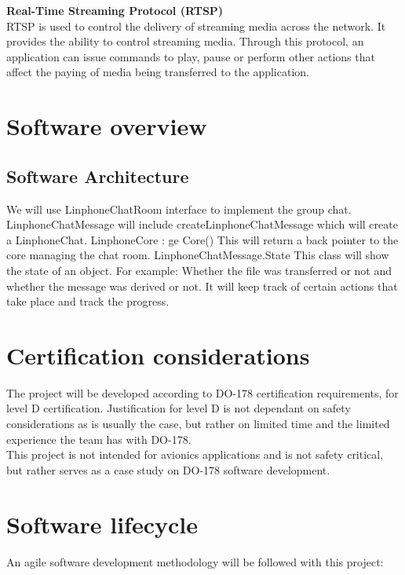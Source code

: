 \documentclass[a4paper]{article}
\begin{document}
\textbf{Real-Time Streaming Protocol (RTSP)\\}
RTSP is used to control the delivery of streaming media across the network. It provides the ability to control streaming media. Through this protocol, an application can issue commands to play, pause or perform other actions that affect the paying of media being transferred to the application.
\newpage

\section{Software overview}
\subsection{Software Architecture}

We will use LinphoneChatRoom interface to implement the group chat. LinphoneChatMessage will include createLinphoneChatMessage which will create a LinphoneChat. 
LinphoneCore : ge Core()  This will return a back pointer to the core managing the chat room.
LinphoneChatMessage.State
This class will show the state of an object. For example: Whether the file was transferred or not and whether the message was derived or not. It will keep track of certain actions that take place and track the progress.

\newpage


\section{Certification considerations}
The project will be developed according to DO-178 certification requirements, for level D certification. Justification for level D is not dependant on safety considerations as is usually the case, but rather on limited time and the limited experience the team has with DO-178.\\
This project is not intended for avionics applications and is not safety critical, but rather serves as a case study on DO-178 software development.\\
\newpage

\section{Software lifecycle}
An agile software development methodology will be followed with this project:\\
\end{document}
